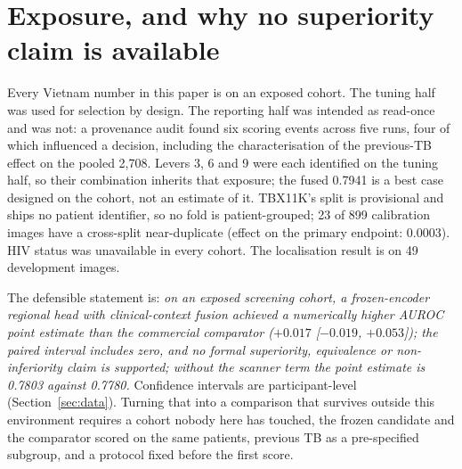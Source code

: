 \documentclass[11pt,a4paper]{article}
\newcommand{\ci}[2]{[$#1$, $#2$]}
\begin{document}
\section{Exposure, and why no superiority claim is available}\label{sec:exposure}
Every Vietnam number in this paper is on an exposed cohort. The tuning half was used for selection by design. The reporting half was intended as read-once and was not: a provenance audit found six scoring events across five runs, four of which influenced a decision, including the characterisation of the previous-TB effect on the pooled 2,708. Levers 3, 6 and 9 were each identified on the tuning half, so their combination inherits that exposure; the fused 0.7941 is a best case designed on the cohort, not an estimate of it. TBX11K's split is provisional and ships no patient identifier, so no fold is patient-grouped; 23 of 899 calibration images have a cross-split near-duplicate (effect on the primary endpoint: 0.0003). HIV status was unavailable in every cohort. The localisation result is on 49 development images.

The defensible statement is: \emph{on an exposed screening cohort, a frozen-encoder regional head with clinical-context fusion achieved a numerically higher AUROC point estimate than the commercial comparator ($+0.017$ \ci{-0.019}{+0.053}); the paired interval includes zero, and no formal superiority, equivalence or non-inferiority claim is supported; without the scanner term the point estimate is 0.7803 against 0.7780.} Confidence intervals are participant-level (Section~\ref{sec:data}). Turning that into a comparison that survives outside this environment requires a cohort nobody here has touched, the frozen candidate and the comparator scored on the same patients, previous TB as a pre-specified subgroup, and a protocol fixed before the first score.
\end{document}
